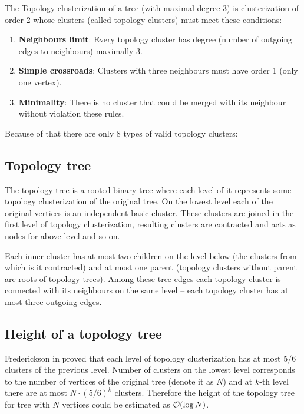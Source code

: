 The {\I Topology clusterization} of a tree (with maximal degree 3) is clusterization
of order 2 whose clusters (called {\I topology clusters}) must meet these conditions:
\begin{enumerate}
\item {\bf Neighbours limit}: Every topology cluster has degree (number of
outgoing edges to neighbours) maximally 3.
\item {\bf Simple crossroads}: Clusters with three neighbours must have order 1 (only one vertex).
\item {\bf Minimality}: There is no cluster that could be merged with its neighbour
without violation these rules.
\end{enumerate}

Because of that there are only 8 types of valid topology clusters:


\subsection{Topology tree}

The {\I topology tree} is a rooted binary tree where each
level of it represents some topology clusterization of the original tree. On the
lowest level each of the original vertices is an independent basic cluster.
These clusters are joined in the first level of topology clusterization,
resulting clusters are contracted and acts as nodes for above level and so on.

Each inner cluster has at most two children on the level below (the clusters
from which is it contracted) and at most one parent (topology clusters without
parent are roots of topology trees). Among these tree edges each topology
cluster is connected with its neighbours on the same level -- each topology
cluster has at most three outgoing edges.

\subsection{Height of a topology tree}

Frederickson in \cite{DSforDynamicallyMaintainingRootedTrees} proved that each
level of topology clusterization has at most $5/6$ clusters of the previous
level. Number of clusters on the lowest level corresponds to the number of
vertices of the original tree (denote it as $N$) and at $k$-th level there are
at most $N\cdot(5/6)^k$ clusters. Therefore the height of the topology tree for
tree with $N$ vertices could be estimated as ${\cal O}(\log N)$.

